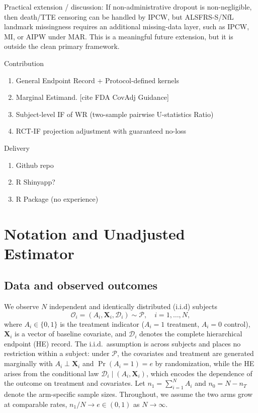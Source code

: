 \documentclass[11pt,a4paper]{article}
\begin{document}
Practical extension / discussion:
If non-administrative dropout is non-negligible, then death/TTE censoring can be handled by IPCW, but ALSFRS-S/NfL landmark missingness requires an additional missing-data layer, such as IPCW, MI, or AIPW under MAR. This is a meaningful future extension, but it is outside the clean primary framework.

Contribution
\begin{enumerate}
    \item General Endpoint Record + Protocol-defined kernels
    \item Marginal Estimand. [cite FDA CovAdj Guidance]
    \item Subject-level IF of WR (two-sample pairwise U-statistics Ratio)
    \item RCT-IF projection adjustment with guaranteed no-loss
\end{enumerate}
Delivery
\begin{enumerate}
    \item Github repo
    \item R Shinyapp?
    \item R Package (no experience)
\end{enumerate}


\section{Notation and Unadjusted Estimator}
\label{sec:unadjusted}

\subsection{Data and observed outcomes}
\label{subsec:data}
We observe $N$ independent and identically distributed (i.i.d) subjects
$$
\mathcal{O}_i = (A_i, \mathbf{X}_i, \mathcal{D}_i) \sim \mathcal{P},\quad i = 1, \ldots, N,
$$
where $A_i \in \{0,1\}$ is the treatment indicator ($A_i = 1$ treatment, $A_i = 0$ control),
$\mathbf{X}_i$ is a vector of baseline covariate, and $\mathcal{D}_i$ denotes the complete hierarchical endpoint (HE) record. The i.i.d.\ assumption is across subjects and places no
restriction within a subject: under $\mathcal{P}$, the covariates and treatment are
generated marginally with $A_i \perp \mathbf{X}_i$ and $\Pr(A_i=1)=e$ by randomization,
while the HE arises from the conditional law $\mathcal{D}_i \mid (A_i, \mathbf{X}_i)$,
which encodes the dependence of the outcome on treatment and covariates. Let $n_1 = \sum_{i=1}^{N} A_i$ and $n_0 = N - n_T$ denote the arm-specific sample sizes. Throughout, we assume the two arms grow at comparable rates, $n_1/N\to e\in(0,1)$ as
$N\to\infty$.
\end{document}
